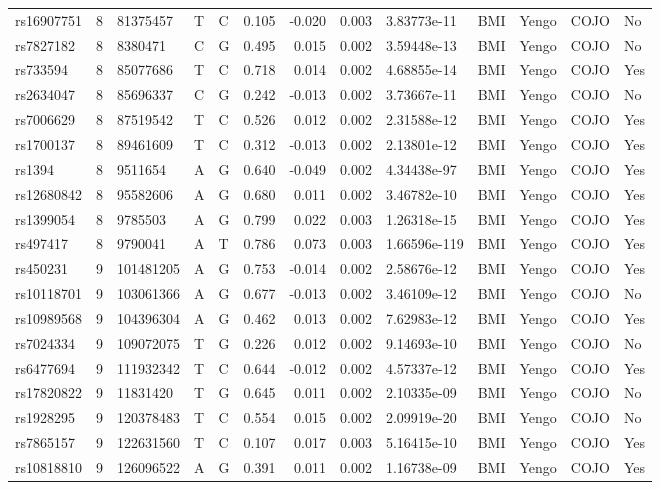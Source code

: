 \documentclass[11pt,twoside]{bristolthesis}
\begin{document}
\begin{longtable}[t]{lrlllrrrlllll}
rs16907751 & 8 & 81375457 & T & C & 0.105 & -0.020 & 0.003 & 3.83773e-11 & BMI & Yengo & COJO & No\\
rs7827182 & 8 & 8380471 & C & G & 0.495 & 0.015 & 0.002 & 3.59448e-13 & BMI & Yengo & COJO & No\\
rs733594 & 8 & 85077686 & T & C & 0.718 & 0.014 & 0.002 & 4.68855e-14 & BMI & Yengo & COJO & Yes\\
rs2634047 & 8 & 85696337 & C & G & 0.242 & -0.013 & 0.002 & 3.73667e-11 & BMI & Yengo & COJO & No\\
\addlinespace
rs7006629 & 8 & 87519542 & T & C & 0.526 & 0.012 & 0.002 & 2.31588e-12 & BMI & Yengo & COJO & Yes\\
rs1700137 & 8 & 89461609 & T & C & 0.312 & -0.013 & 0.002 & 2.13801e-12 & BMI & Yengo & COJO & Yes\\
rs1394 & 8 & 9511654 & A & G & 0.640 & -0.049 & 0.002 & 4.34438e-97 & BMI & Yengo & COJO & Yes\\
rs12680842 & 8 & 95582606 & A & G & 0.680 & 0.011 & 0.002 & 3.46782e-10 & BMI & Yengo & COJO & Yes\\
rs1399054 & 8 & 9785503 & A & G & 0.799 & 0.022 & 0.003 & 1.26318e-15 & BMI & Yengo & COJO & Yes\\
\addlinespace
rs497417 & 8 & 9790041 & A & T & 0.786 & 0.073 & 0.003 & 1.66596e-119 & BMI & Yengo & COJO & Yes\\
rs450231 & 9 & 101481205 & A & G & 0.753 & -0.014 & 0.002 & 2.58676e-12 & BMI & Yengo & COJO & Yes\\
rs10118701 & 9 & 103061366 & A & G & 0.677 & -0.013 & 0.002 & 3.46109e-12 & BMI & Yengo & COJO & No\\
rs10989568 & 9 & 104396304 & A & G & 0.462 & 0.013 & 0.002 & 7.62983e-12 & BMI & Yengo & COJO & Yes\\
rs7024334 & 9 & 109072075 & T & G & 0.226 & 0.012 & 0.002 & 9.14693e-10 & BMI & Yengo & COJO & No\\
\addlinespace
rs6477694 & 9 & 111932342 & T & C & 0.644 & -0.012 & 0.002 & 4.57337e-12 & BMI & Yengo & COJO & Yes\\
rs17820822 & 9 & 11831420 & T & G & 0.645 & 0.011 & 0.002 & 2.10335e-09 & BMI & Yengo & COJO & No\\
rs1928295 & 9 & 120378483 & T & C & 0.554 & 0.015 & 0.002 & 2.09919e-20 & BMI & Yengo & COJO & No\\
rs7865157 & 9 & 122631560 & T & C & 0.107 & 0.017 & 0.003 & 5.16415e-10 & BMI & Yengo & COJO & Yes\\
rs10818810 & 9 & 126096522 & A & G & 0.391 & 0.011 & 0.002 & 1.16738e-09 & BMI & Yengo & COJO & Yes\\

\end{longtable}
\end{document}
